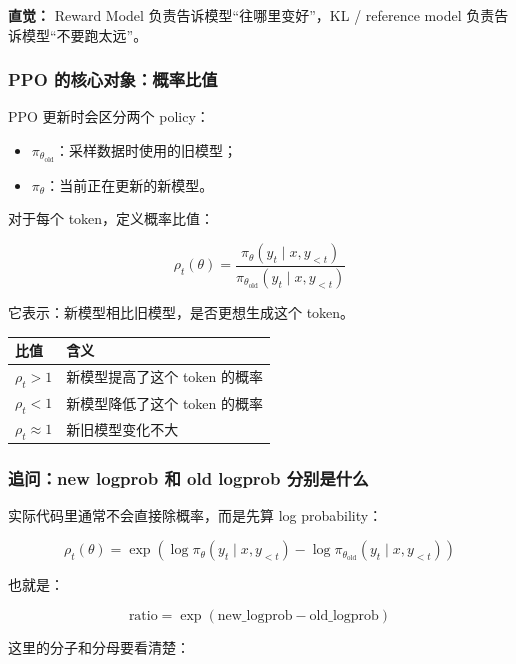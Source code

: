 \begin{intubox}
\textbf{直觉：} Reward Model 负责告诉模型“往哪里变好”，KL / reference model 负责告诉模型“不要跑太远”。
\end{intubox}

\subsubsection{PPO 的核心对象：概率比值}

PPO 更新时会区分两个 policy：

\begin{itemize}[leftmargin=1.5em]
  \item $\pi_{\theta_\text{old}}$：采样数据时使用的旧模型；
  \item $\pi_\theta$：当前正在更新的新模型。
\end{itemize}

对于每个 token，定义概率比值：

\[
\rho_t(\theta)
=
\frac{
\pi_\theta(y_t \mid x, y_{<t})
}{
\pi_{\theta_\text{old}}(y_t \mid x, y_{<t})
}
\]

它表示：新模型相比旧模型，是否更想生成这个 token。

\begin{center}
{\small
\begin{tabular}{p{3cm}p{9.8cm}}
\hline
\textbf{比值} & \textbf{含义} \\
\hline
$\rho_t > 1$ & 新模型提高了这个 token 的概率 \\
$\rho_t < 1$ & 新模型降低了这个 token 的概率 \\
$\rho_t \approx 1$ & 新旧模型变化不大 \\
\hline
\end{tabular}
}
\end{center}

\subsubsection{追问：new logprob 和 old logprob 分别是什么}

实际代码里通常不会直接除概率，而是先算 log probability：

\[
\rho_t(\theta)
=
\exp\left(
\log \pi_\theta(y_t \mid x, y_{<t})
-
\log \pi_{\theta_\text{old}}(y_t \mid x, y_{<t})
\right)
\]

也就是：

\[
\text{ratio}
=
\exp(\text{new\_logprob} - \text{old\_logprob})
\]

这里的分子和分母要看清楚：

